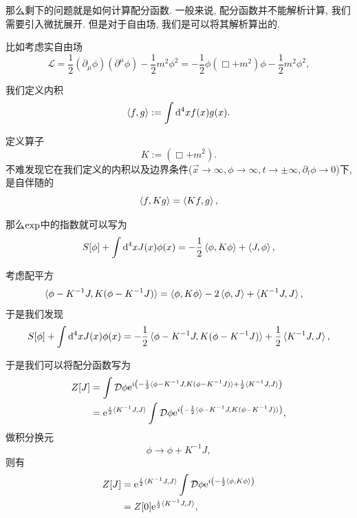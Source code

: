 那么剩下的问题就是如何计算配分函数. 一般来说, 配分函数并不能解析计算, 我们需要引入微扰展开. 但是对于自由场, 我们是可以将其解析算出的.

比如考虑实自由场
\begin{equation}
    \mathcal L=\frac12(\partial_\mu\phi)(\partial^\mu\phi)-\frac12m^2\phi^2=-\frac12\phi(\Box+m^2)\phi-\frac12m^2\phi^2,
\end{equation}

我们定义内积
\begin{equation}
    \braket{f, g}:=\int\d^4x f(x)g(x).
\end{equation}

定义算子
\begin{equation}
    K:=(\Box+m^2).
\end{equation}
不难发现它在我们定义的内积以及边界条件($\vec x\to\infty, \phi\to\infty, t\to\pm\infty, \partial_t\phi\to0$)下, 是自伴随的
\begin{equation}
    \braket{f, Kg}=\braket{Kf, g},
\end{equation}

那么$\rm{exp}$中的指数就可以写为
\begin{equation}
    S[\phi]+\int\d^4xJ(x)\phi(x)=-\frac12\braket{\phi, K\phi}+\braket{J, \phi},
\end{equation}

考虑配平方
\begin{align}
    \braket{\phi-K^{-1}J, K(\phi-K^{-1}J)}&=\braket{\phi, K\phi}-2\braket{\phi, J}+\braket{K^{-1}J, J},
\end{align}
于是我们发现
\begin{equation}
    S[\phi]+\int\d^4xJ(x)\phi(x)=-\frac12\braket{\phi-K^{-1}J, K(\phi-K^{-1}J)}+\frac12\braket{K^{-1}J, J},
\end{equation}

于是我们可以将配分函数写为
\begin{align}
    Z[J]&=\int\mathcal D\phi\exp{i\left(-\frac12\braket{\phi-K^{-1}J, K(\phi-K^{-1}J)}+\frac12\braket{K^{-1}J, J}\right)}\\
    &=\exp{\frac i2\braket{K^{-1}J, J}}\int\mathcal D\phi\exp{i\left(-\frac12\braket{\phi-K^{-1}J, K(\phi-K^{-1}J)}\right)},
\end{align}
做积分换元
\begin{equation}
    \phi\to\phi+K^{-1}J,
\end{equation}
则有
\begin{align}
    Z[J]&=\exp{\frac i2\braket{K^{-1}J, J}}\int\mathcal D\phi\exp{i\left(-\frac12\braket{\phi, K\phi}\right)}\\
    &=Z[0]\exp{\frac i2\braket{K^{-1}J, J}},
\end{align}

